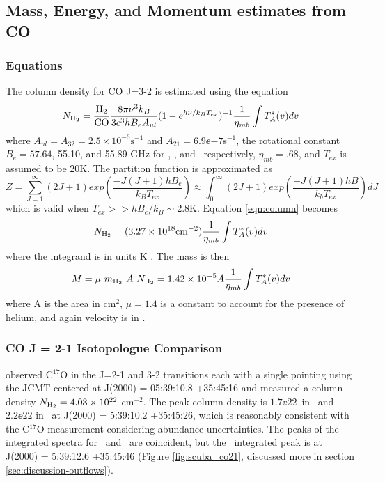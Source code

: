 \subsection{Mass, Energy, and Momentum estimates from CO}

\subsubsection{Equations}
The column density for CO J=3-2 is estimated using the equation 
\begin{equation}
  \label{eqn:column}
N_{\textrm{H}_{2}} =
\frac{\textrm{H}_{2}}{\textrm{CO}}\frac{8\pi\nu^3k_B}{3c^3hB_eA_{ul}}(1-e^{h\nu/k_BT_{ex}})^{-1}
\frac{1}{\eta_{mb}} \int T_A^*(v) dv 
\end{equation}
where $A_{ul}=A_{32}=2.5\times10^{-6}\textrm{s}^{-1}$ and
$A_{21}=6.9\ee{-7}$s$^{-1}$\citep{turner1977}, the rotational constant $B_e =
57.64$, 55.10, and 55.89  GHz for \twelveco, \thirteenco, and \ceighteeno\ respectively,
$\eta_{mb} = .68$, and $T_{ex}$ is assumed to be 20K.  The partition function
is approximated as 
\begin{equation}
    Z=\sum_{J=1}^\infty (2J+1) exp
  \left(\frac{-J(J+1)hB_e}{k_B T_{ex}}\right) \approx \int_0^\infty (2J+1)exp
  \left(\frac{-J(J+1)hB}{k_bT_{ex}}\right) dJ
\end{equation}
which is valid when $T_{ex} >> hB_e/k_B \sim 2.8 $K.
Equation \ref{eqn:column} becomes 
\begin{equation} 
  N_{\textrm{H}_{2}} = ( 3.27\times10^{18} \textrm{cm}^{-2}) \frac{1}{\eta_{mb}} \int T_A^*(v) dv
\end{equation}
where the integrand is in units K \kms.  The mass is then 
\begin{equation}
  M = \mu\ m_{\hh}\ A\ N_{\hh} = 1.42\times10^{-5} A \frac{1}{\eta_{mb}} \int
  T_A^*(v) dv
\end{equation} 
where A is the area in cm$^2$, $\mu=1.4$ is a constant to account for the presence of
helium, and again velocity is in \kms.

\subsubsection{CO J = 2-1 Isotopologue Comparison}
\label{sec:co21}

\citet{Thomas2008} observed C$^{17}$O in the J=2-1 and 3-2 transitions each with a
single pointing using the JCMT centered at J(2000) = 05:39:10.8 +35:45:16 and measured a
column density $N_{\textrm{H}_{2}}=4.03\times10^{22}$ cm$^{-2}$.  The peak column
density is $1.7\ee{22}$\persc\ in \thirteenco\ and $2.2\ee{22}$ in \ceighteeno\ at J(2000) = 5:39:10.2
+35:45:26, which is reasonably consistent with the C$^{17}$O measurement
considering abundance uncertainties.  The peaks of the integrated
spectra for \ceighteeno\ and \thirteenco\ are coincident, but the \twelveco\
integrated peak is at J(2000) = 5:39:12.6 +35:45:46 (Figure \ref{fig:scuba_co21},
discussed more in section \ref{sec:discussion-outflows}).

